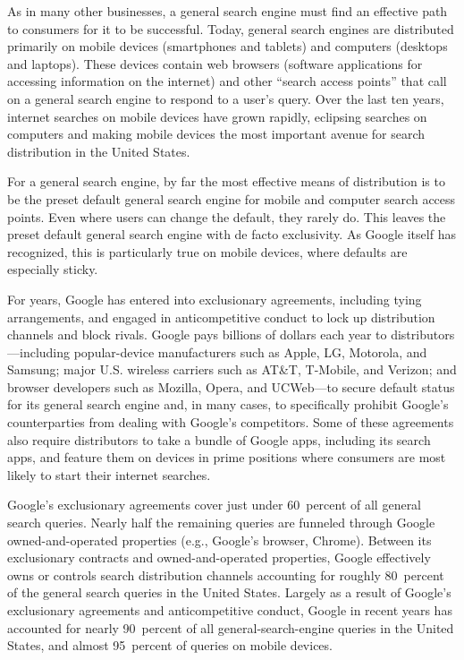 \documentclass[11pt,b5paper,headings=small]{scrartcl}
\begin{document}

As in many other businesses, a general search engine must find an effective path
to consumers for it to be successful. Today, general search engines are distributed primarily on
mobile devices (smartphones and tablets) and computers (desktops and laptops). These devices
contain web browsers (software applications for accessing information on the internet) and other
“search access points” that call on a general search engine to respond to a user’s query. Over the
last ten years, internet searches on mobile devices have grown rapidly, eclipsing searches on
computers and making mobile devices the most important avenue for search distribution in the
United States.


For a general search engine, by far the most effective means of distribution is to
be the preset default general search engine for mobile and computer search access points. Even
where users can change the default, they rarely do. This leaves the preset default general search
engine with de facto exclusivity. As Google itself has recognized, this is particularly true on
mobile devices, where defaults are especially sticky.


For years, Google has entered into exclusionary agreements, including tying
arrangements, and engaged in anticompetitive conduct to lock up distribution channels and block
rivals. Google pays billions of dollars each year to distributors—including popular-device
manufacturers such as Apple, LG, Motorola, and Samsung; major U.S. wireless carriers such as
AT\&T, T-Mobile, and Verizon; and browser developers such as Mozilla, Opera, and UCWeb---to 
secure default status for its general search engine and, in many cases, to specifically prohibit
Google’s counterparties from dealing with Google’s competitors. Some of these agreements also
require distributors to take a bundle of Google apps, including its search apps, and feature them
on devices in prime positions where consumers are most likely to start their internet searches.


Google’s exclusionary agreements cover just under 60~percent of all general
search queries. Nearly half the remaining queries are funneled through Google owned-and-operated properties (e.g., Google’s browser, Chrome). Between its exclusionary contracts and
owned-and-operated properties, Google effectively owns or controls search distribution channels
accounting for roughly 80~percent of the general search queries in the United States. Largely as a
result of Google’s exclusionary agreements and anticompetitive conduct, Google in recent years
has accounted for nearly 90~percent of all general-search-engine queries in the United States, and
almost 95~percent of queries on mobile devices.
\end{document}
